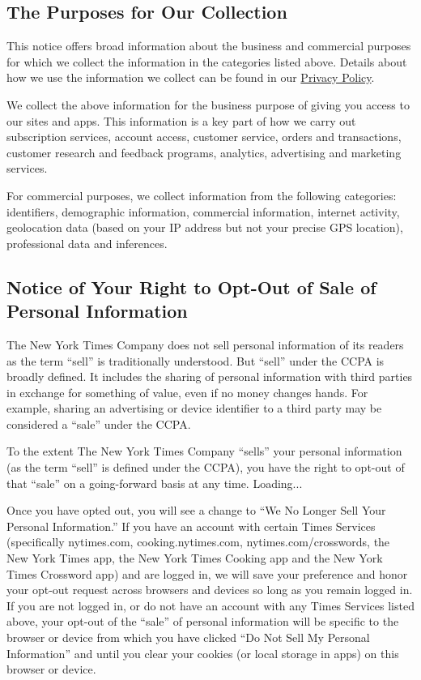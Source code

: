 \hypertarget{the-purposes-for-our-collection}{%
\subsection{The Purposes for Our
Collection}\label{the-purposes-for-our-collection}}

This notice offers broad information about the business and commercial
purposes for which we collect the information in the categories listed
above. Details about how we use the information we collect can be found
in our
\href{http://www.nytimes.com/privacy/privacy-policy\#what--do-we-do-with-the-information-we-gather}{Privacy
Policy}.

We collect the above information for the business purpose of giving you
access to our sites and apps. This information is a key part of how we
carry out subscription services, account access, customer service,
orders and transactions, customer research and feedback programs,
analytics, advertising and marketing services.

For commercial purposes, we collect information from the following
categories: identifiers, demographic information, commercial
information, internet activity, geolocation data (based on your IP
address but not your precise GPS location), professional data and
inferences.

\hypertarget{notice-of-your-right-to-opt-out-of-sale-of-personal-information}{%
\subsection{Notice of Your Right to Opt-Out of Sale of Personal
Information}\label{notice-of-your-right-to-opt-out-of-sale-of-personal-information}}

The New York Times Company does not sell personal information of its
readers as the term ``sell'' is traditionally understood. But ``sell''
under the CCPA is broadly defined. It includes the sharing of personal
information with third parties in exchange for something of value, even
if no money changes hands. For example, sharing an advertising or device
identifier to a third party may be considered a ``sale'' under the CCPA.

To the extent The New York Times Company ``sells'' your personal
information (as the term ``sell'' is defined under the CCPA), you have
the right to opt-out of that ``sale'' on a going-forward basis at any
time. Loading...

Once you have opted out, you will see a change to ``We No Longer Sell
Your Personal Information.'' If you have an account with certain Times
Services (specifically nytimes.com, cooking.nytimes.com,
nytimes.com/crosswords, the New York Times app, the New York Times
Cooking app and the New York Times Crossword app) and are logged in, we
will save your preference and honor your opt-out request across browsers
and devices so long as you remain logged in. If you are not logged in,
or do not have an account with any Times Services listed above, your
opt-out of the ``sale'' of personal information will be specific to the
browser or device from which you have clicked ``Do Not Sell My Personal
Information'' and until you clear your cookies (or local storage in
apps) on this browser or device.

